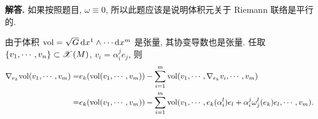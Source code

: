 \documentclass{ctexart}
\newenvironment{solution}{\par\noindent\textbf{解答. }}{\par}
\begin{document}
\begin{solution}
    如果按照题目, $\omega \equiv 0$, 所以此题应该是说明体积元关于 Riemann 联络是平行的.

    由于体积 $\mathrm{vol} = \sqrt{G}\mathop{}\!\mathrm{d} x^1 \wedge \cdots \mathop{}\!\mathrm{d} x^m$ 是张量, 其协变导数也是张量. 任取 $\{v_1, \cdots, v_n\} \subset \mathscr{X}(M)$, $v_i = \alpha^{j}_{i}e_j$, 则
    \[
        \begin{aligned}
            \nabla_{e_k}{\mathrm{vol}}(v_1, \cdots, v_m)
            =& e_k(\mathrm{vol}(v_1, \cdots, v_m)) - \sum_{i = 1}^{m}\mathrm{vol}(v_1, \cdots, \nabla_{e_k}{v_i}, \cdots, v_m) \\
            =& e_k(\mathrm{vol}(v_1, \cdots, v_m)) - \sum_{i = 1}^{m}\mathrm{vol}(v_1, \cdots, e_k(\alpha^{l}_{i})e_l + \alpha^{j}_{i}\omega^{l}_{j}(e_k)e_l, \cdots, v_m).
        \end{aligned}
    \]


\end{solution}
\end{document}
